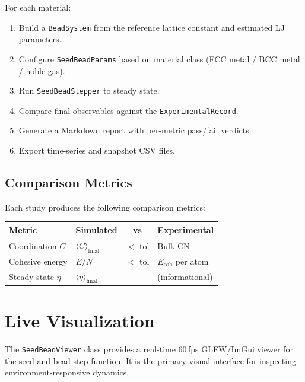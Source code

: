 \documentclass[11pt, a4paper, oneside]{article}
\newcommand{\type}[1]{\texttt{#1}}
\begin{document}
For each material:
\begin{enumerate}
  \item Build a \type{BeadSystem} from the reference lattice constant
        and estimated LJ parameters.
  \item Configure \type{SeedBeadParams} based on material class
        (FCC metal / BCC metal / noble gas).
  \item Run \type{SeedBeadStepper} to steady state.
  \item Compare final observables against the \type{ExperimentalRecord}.
  \item Generate a Markdown report with per-metric pass/fail verdicts.
  \item Export time-series and snapshot CSV files.
\end{enumerate}

\subsection{Comparison Metrics}
\label{sec:comparison-metrics}

Each study produces the following comparison metrics:

\begin{center}
\begin{tabular}{llcl}
  \toprule
  \textbf{Metric} & \textbf{Simulated} & \textbf{vs} & \textbf{Experimental} \\
  \midrule
  Coordination $C$ & $\langle C \rangle_{\text{final}}$ & $<$ tol & Bulk CN \\
  Cohesive energy  & $E/N$ & $<$ tol & $E_{\text{coh}}$ per atom \\
  Steady-state $\eta$ & $\langle\eta\rangle_{\text{final}}$ & --- & (informational) \\
  \bottomrule
\end{tabular}
\end{center}

\newpage
\section{Live Visualization}
\label{sec:live-visualization}

The \type{SeedBeadViewer} class provides a real-time 60\,fps GLFW/ImGui
viewer for the seed-and-bead step function.  It is the primary visual
interface for inspecting environment-responsive dynamics.
\end{document}
